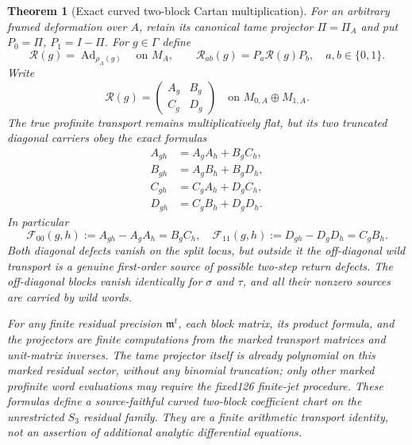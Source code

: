 \documentclass[11pt]{article}
\newtheorem{theorem}{Theorem}[section]
\theoremstyle{definition}
\begin{document}
\begin{theorem}[Exact curved two-block Cartan multiplication]
\label{thm:dyadic-f131-curved-tame-transport}
For an arbitrary framed
deformation over $A$,
retain its canonical tame
projector $\Pi=\Pi_A$
and put
$P_0=\Pi$, $P_1=I-\Pi$.
For $g\in\Gamma$ define
\[
\mathcal R(g)=\operatorname{Ad}_{\rho_A(g)}
\quad\text{on }M_A,
\qquad
\mathcal R_{ab}(g)=P_a\mathcal R(g)P_b,
\quad a,b\in\{0,1\}.
\]
Write
\begin{equation}\label{eq:dyadic-f131-curved-two-blocks}
\mathcal R(g)=
\begin{pmatrix}
A_g&B_g\\ C_g&D_g
\end{pmatrix}
\quad\text{on }M_{0,A}\oplus M_{1,A}.
\end{equation}
The true profinite
transport remains
multiplicatively flat,
but its two truncated
diagonal carriers obey
the \emph{exact} formulas
\begin{equation}\label{eq:dyadic-f131-curved-block-products}
\boxed{
\begin{aligned}
A_{gh}&=A_gA_h+B_gC_h,\\
B_{gh}&=A_gB_h+B_gD_h,\\
C_{gh}&=C_gA_h+D_gC_h,\\
D_{gh}&=C_gB_h+D_gD_h.
\end{aligned}}
\end{equation}
In particular
\begin{equation}\label{eq:dyadic-f131-two-step-return-curvature}
\boxed{\quad
\mathscr F_{00}(g,h)
:=A_{gh}-A_gA_h=B_gC_h,
\quad
\mathscr F_{11}(g,h)
:=D_{gh}-D_gD_h=C_gB_h.
\quad}
\end{equation}
Both diagonal defects
vanish on the split
locus, but outside it
the off-diagonal
wild transport is a
genuine first-order
source of possible
two-step return defects.
The off-diagonal blocks
vanish identically for
$\sigma$ and $\tau$,
and all their nonzero
sources are carried by
wild words.

For any finite residual
precision $\mathfrak m^t$,
each block matrix,
its product formula,
and the projectors
are finite computations
from the marked
transport matrices
and unit-matrix inverses.
The tame projector itself
is already polynomial
on this marked residual
sector, without any
binomial truncation;
only other marked
profinite word evaluations
may require the fixed126
finite-jet procedure.
These formulas define
a \emph{source-faithful
curved two-block
coefficient chart} on
the unrestricted
$S_3$ residual family.
They are a
finite arithmetic
transport identity,
not an assertion of
additional analytic
differential equations.
\end{theorem}
\end{document}
